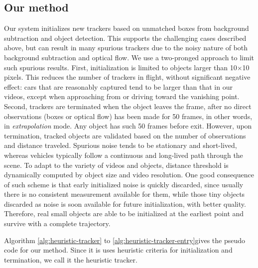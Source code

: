 \subsection{Our method}
Our system initializes new trackers based on unmatched boxes from background subtraction and object detection. This supports the challenging cases described above, but can result in many spurious trackers due to the noisy nature of both background subtraction and optical flow. We use a two-pronged approach to limit such spurious results. First, initialization is limited to objects larger than 10$\times$10 pixels. This reduces the number of trackers in flight, without significant negative effect: 
cars that are reasonably captured tend to be larger than that in our videos, except when approaching from or driving toward the vanishing point. 
Second, trackers are terminated when the object leaves the frame, after no direct observations (boxes or optical flow) has been made for 50 frames, in other words, in \emph{extrapolation} mode. Any object has such 50 frames before exit. However, upon termination, tracked objects are validated based on the number of observations and distance traveled. Spurious noise tends to be stationary and short-lived, whereas vehicles typically follow a continuous and long-lived path through the scene. To adapt to the variety of videos and objects, distance threshold is dynamically computed by object size and video resolution. 
One good consequence of such scheme is that early initialized noise is quickly discarded, since usually there is no consistent measurement available for them, while those tiny objects discarded as noise is soon available for future initialization, with better quality. Therefore, real small objects are able to be initialized at the earliest point and survive with a complete trajectory. 

Algorithm \ref{alg:heuristic-tracker} to \ref{alg:heuristic-tracker-entry}gives the pseudo code for our method. Since it is uses heuristic criteria for initialization and termination, we call it the heuristic tracker.


